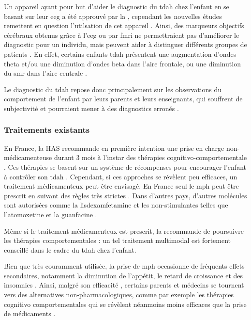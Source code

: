 Un appareil ayant pour but d'aider le diagnostic du \gls{tdah} chez l'enfant en se basant sur leur \gls{eeg} 
a été approuvé par la \citet{FDA} \citep{NebaHealth}, cependant les nouvelles études remettent en question l'utilsation de cet appareil \citep{Arns2013, 
Zhang2017}. Ainsi, des marqueurs objectifs cérébraux obtenus grâce à l'\gls{eeg} ou par \gls{fmri} ne permettraient pas d'améliorer le diagnostic pour un individu, mais
peuvent aider à distinguer différents groupes de patients \citep{Johnstone2005, Zhang2017, Clarke2011}. En effet, certains enfants \gls{tdah} 
présentent une augmentation d'ondes theta et/ou une diminution d'ondes beta dans l'aire frontale, ou une diminution du \gls{smr} dans l'aire centrale
\citep{Monastra2005, Janzen1995, Loo2018}. 

Le diagnostic du \gls{tdah} repose donc principalement sur les observations du comportement de l'enfant par leurs parents et leurs enseignants, qui souffrent de
subjectivité et pourraient mener à des diagnostics erronés \citep{Lambez2019}.

\subsubsection{Traitements existants} \label{traitements_existants}

En France, la HAS recommande en première intention une prise en charge non-médicamenteuse durant 3 mois à l'instar des thérapies cognitivo-comportementale \citep{HAS}. 
Ces thérapies se basent sur un système de récompenses pour encourager l'enfant à contrôler son \gls{tdah} \citep{Evans2011, Sonuga2004}.
Cependant, si ces approches se révèlent peu efficaces, un traitement médicamenteux peut être envisagé. En France seul le \gls{mph}
peut être prescrit en suivant des règles très strictes \citep{HAS}. Dans d'autres pays, d'autres molécules sont autorisées comme la lisdexamfetamine et 
les non-stimulantes telles que l'atomoxetine et la guanfacine \citep{Luan2017}.

Même si le traitement médicamenteux est prescrit, la \citet{HAS} recommande de poursuivre les thérapies comportementales : un tel traitement multimodal 
est fortement conseillé dans le cadre du \gls{tdah} chez l'enfant.

Bien que très couramment utilisée,  la prise de \gls{mph} occasionne de fréquents effets secondaires,
notamment la diminution de l'appétit, le retard de croissance et des insomnies \citep{Sousa2012}. Ainsi, malgré son efficacité \citep{Taylor2014,
Storebo2015, Swanson2017}, certains parents et médecins se tournent vers des alternatives non-pharmacologiques, comme par exemple les thérapies cognitivo 
comportementales \citep{Berger2008} qui se révèlent néanmoins
moins efficaces que la prise de médicaments \citep{Sonuga-Barke2013}. 

